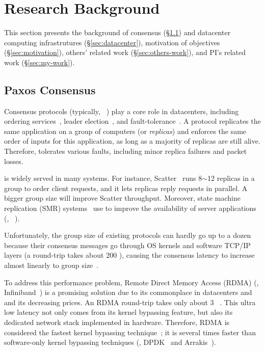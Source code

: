\vspace{-.15in}\section{Research Background} 
\label{sec:background}\vspace{-.075in}

This section presents the background of consensus (\S\ref{sec:consensus}) and 
datacenter computing infrastrutures (\S\ref{sec:datacenter}), motivation of 
objectives (\S\ref{sec:motivation}), others' related work 
(\S\ref{sec:others-work}), and PI's related work (\S\ref{sec:my-work}).

\vspace{-.15in}\subsection{Paxos Consensus} 
\label{sec:consensus}\vspace{-.075in}

Consensus protocols (typically, 
\paxos~\cite{paxos:practical,paxos,paxos:simple,paxos:complex}) play a core
role in datacenters, including 
ordering services~\cite{ellis:thesis,manos:hotdep10,scatter:sosp11},
leader election~\cite{zookeeper, chubby:osdi}, and
fault-tolerance~\cite{eve:osdi12,rex:eurosys14,crane:sosp15}. A \paxos protocol
replicates the same application on a group of computers (or \emph{replicas}) 
and enforces the same order of inputs for this application, as long as 
a majority of replicas are still alive. Therefore, \paxos tolerates 
various faults, including minor replica failures and packet losses.

\paxos is widely served in many systems. For instance, 
Scatter~\cite{scatter:sosp11} runs 8$\sim$12 replicas in a
\paxos group to order client requests, and it lets replicas reply requests
in parallel. A bigger group size will improve Scatter throughput. 
Moreover, state machine replication (SMR) 
systems~\cite{eve:osdi12,rex:eurosys14,crane:sosp15} use \paxos to 
improve the availability of server applications (\eg, \mysql~\cite{mysql}).

Unfortunately, the group size of existing \paxos protocols can hardly go up 
to a dozen because their consensus messages go through OS kernels and software 
TCP/IP layers (a round-trip takes about 200 \us), causing the consensus 
latency to increase almost linearly to 
group size~\cite{scatter:sosp11,zookeeper,crane:sosp15}.

To address this \paxos performance problem, Remote Direct Memory Access (RDMA) 
(\eg, Infiniband~\cite{infiniband}) is a promising solution due to its 
commonplace in datacenters and and its decreasing prices. An RDMA round-trip 
takes only about 3 \us~\cite{pilaf:usenix14}. This ultra low latency not only 
comes from its kernel bypassing feature, but also its dedicated network stack 
implemented in hardware. Therefore, RDMA is considered the fastest kernel 
bypassing technique~\cite{herd:sigcomm14,pilaf:usenix14,dare:hpdc15}; it is 
several times faster than software-only kernel bypassing techniques (\eg, 
DPDK~\cite{dpdk} and Arrakis~\cite{arrakis:osdi14}).

